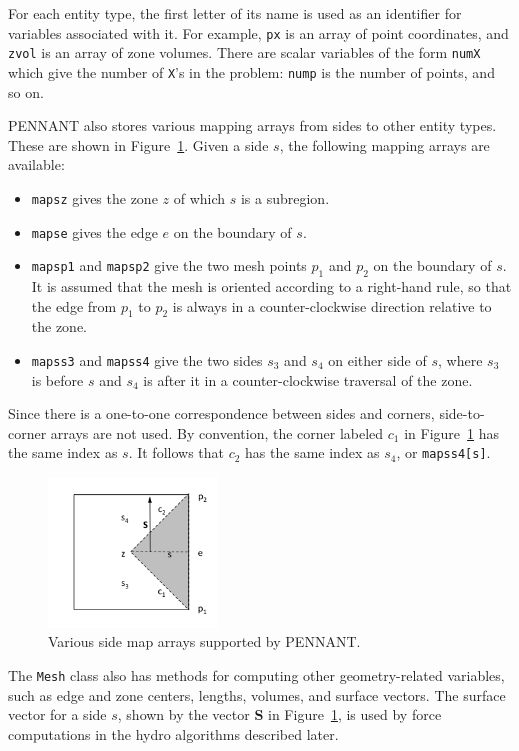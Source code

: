\documentclass[11pt,letterpaper]{article}
\begin{document}
For each entity type, the first letter of its name is used as an
identifier for variables associated with it.  For example, {\tt px}
is an array of point coordinates, and {\tt zvol} is an array
of zone volumes.  There are scalar variables of the form
{\tt numX} which give the number of {\tt X}'s in the problem:
{\tt nump} is the number of points, and so on.

PENNANT also stores various mapping arrays from sides to other entity
types.  These are shown in Figure~\ref{fig:side}.
Given a side $s$, the following mapping arrays are available:
\begin{itemize} \itemsep1pt \parskip0pt
\item {\tt mapsz} gives the zone $z$ of which $s$ is a subregion.
\item {\tt mapse} gives the edge $e$ on the boundary of $s$.
\item {\tt mapsp1} and {\tt mapsp2} give the two mesh points $p_1$ and
$p_2$ on the boundary of $s$.  It is assumed that the mesh is oriented
according to a right-hand rule, so that the edge from $p_1$ to $p_2$
is always in a counter-clockwise direction relative to the zone.
\item {\tt mapss3} and {\tt mapss4} give the two sides $s_3$ and
$s_4$ on either side of $s$, where $s_3$ is before $s$ and $s_4$ is
after it in a counter-clockwise traversal of the zone.
\end{itemize}
Since there is a one-to-one correspondence between sides and corners,
side-to-corner arrays are not used.  By convention, the corner labeled
$c_1$ in Figure~\ref{fig:side} has the same index as $s$.  It follows
that $c_2$ has the same index as $s_4$, or {\tt mapss4[s]}.

\begin{figure}
    \centering
    \includegraphics[width=0.40\textwidth]{side-maps.png}
    \caption{Various side map arrays supported by PENNANT.}
    \label{fig:side}
\end{figure}

The {\tt Mesh} class also has methods for computing other
geometry-related variables, such as edge and zone centers, lengths,
volumes, and surface vectors.  The surface vector for a side $s$, shown
by the vector {\bf S} in Figure~\ref{fig:side}, is used by force
computations in the hydro algorithms described later.
\end{document}
